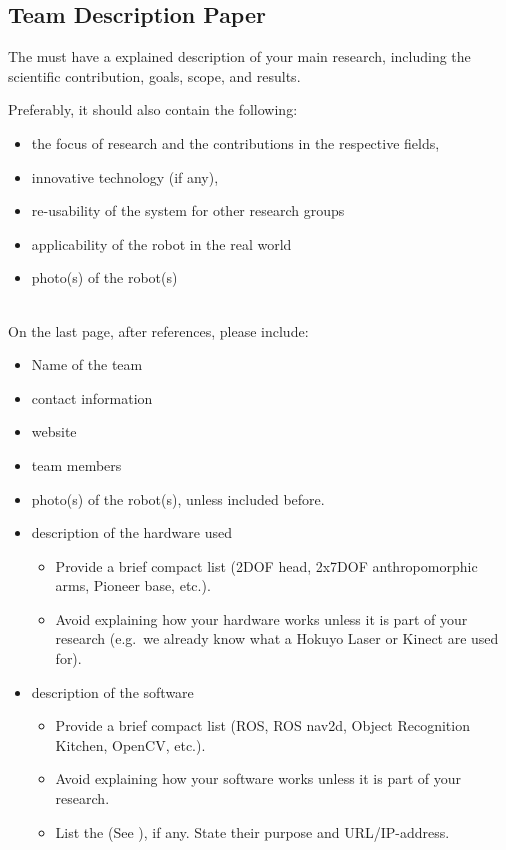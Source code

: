 \subsection{Team Description Paper}
\label{rule:website_tdp}

The  must have a explained description of your main research, including the scientific contribution, goals, scope, and results.

Preferably, it should also contain the following:
\begin{itemize}
	\item the focus of research and the contributions in the respective fields, 
	\item innovative technology (if any), 
	\item re-usability of the system for other research groups
	\item applicability of the robot in the real world
	\item photo(s) of the robot(s)
\end{itemize}

~\\\noindent On the last page, after references, please include:
\begin{itemize}
	\item Name of the team
	\item contact information
	\item website
	\item team members
	\item photo(s) of the robot(s), unless included before.
	\item description of the hardware used 
	\begin{itemize}
		\item Provide a brief compact list (2DOF head, 2x7DOF anthropomorphic arms, Pioneer base, etc.).
		\item Avoid explaining how your hardware works unless it is part of your research (e.g.~we already know what a Hokuyo Laser or Kinect are used for).
	\end{itemize}
	\item description of the software
	\begin{itemize}
		\item Provide a brief compact list (ROS, ROS nav2d, Object Recognition Kitchen, OpenCV, etc.).
		\item Avoid explaining how your software works unless it is part of your research.
		\item List the  (See ), if any. State their purpose and URL/IP-address. 
	\end{itemize}
\end{itemize}

